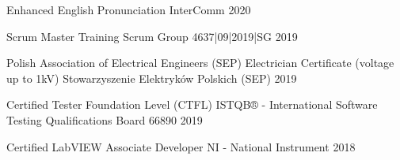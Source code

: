 

\begin{cvhonors}

  \cvhonor
    {Enhanced English Pronunciation} %
    {InterComm} %
    {} %
    {2020} %

  \cvhonor
    {Scrum Master Training} %
    {Scrum Group} %
    {4637|09|2019|SG} %
    {2019} %

  \cvhonor
    {Polish Association of Electrical Engineers (SEP) Electrician Certificate (voltage up to 1kV)} %
    {Stowarzyszenie Elektryków Polskich (SEP)} %
    {} %
    {2019} %

  \cvhonor
    {Certified Tester Foundation Level (CTFL)} %
    {ISTQB® - International Software Testing Qualifications Board} %
    {66890} %
    {2019} %

  \cvhonor
    {Certified LabVIEW Associate Developer} %
    {NI - National Instrument} %
    {} %
    {2018} %

\end{cvhonors}
